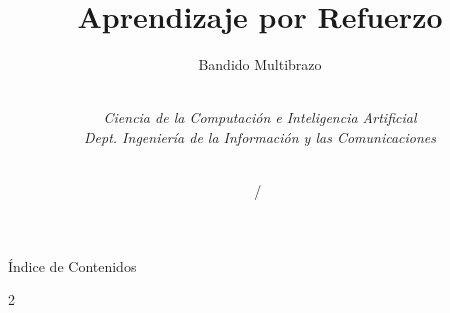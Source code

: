 \documentclass[10pt, envcountsect, handout, aspectratio=1610, hyperref={hypertexnames=true}]{beamer}
\title[Aprendizaje por Refuerzo]{Aprendizaje por Refuerzo}
\subtitle{Bandido Multibrazo} %
\author[L. D. Hernández] %
{%
	\sc{Luis Daniel Hernández Molinero }\\ %
	\textit{Ciencia de la Computación e Inteligencia Artificial}\\  %
	\textit{Dept. Ingeniería de la Información y las Comunicaciones}\\  %
	\\   %
}
\institute[DIIC]%
{
	\textit{Universidad de Murcia}
}
\date{\arabic{yearnext}\ / \the\year\ } %
\begin{document}
	



\begin{frame}[plain]
	\titlepage
\end{frame}


\begin{frame}{Índice de Contenidos}
	\begin{multicols*}{2}
	\tableofcontents 
	\end{multicols*}
	
\end{frame}




%
%
%
%
%






\end{document}
